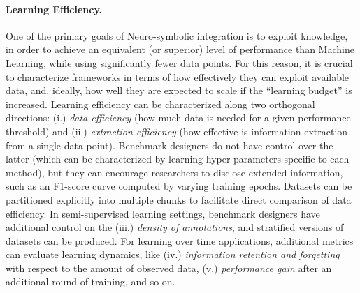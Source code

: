 \paragraph{Learning Efficiency.} One of the primary goals of Neuro-symbolic integration is to exploit knowledge, in order to achieve an equivalent (or superior) level of performance than Machine Learning, while using significantly fewer data points. For this reason, it is crucial to characterize frameworks in terms of how effectively they can exploit available data, and, ideally, how well they are expected to scale if the ``learning budget'' is increased. 
%
Learning efficiency can be characterized along two orthogonal directions: (i.) \textit{data efficiency} (how much data is needed for a given performance threshold) and (ii.) \textit{extraction efficiency} (how effective is information extraction from a single data point).
Benchmark designers do not have control over the latter (which can be characterized by learning hyper-parameters specific to each method), but they can encourage researchers to disclose extended information, such as an F1-score curve computed by varying training epochs.
Datasets can be partitioned explicitly into multiple chunks to facilitate direct comparison of data efficiency. %
%
In semi-supervised learning settings, benchmark designers have additional control on the (iii.) \textit{density of annotations}, and stratified versions of datasets can be produced.
For learning over time applications, additional metrics can evaluate learning dynamics, like (iv.) \textit{information retention and forgetting} with respect to the amount of observed data, (v.) \textit{performance gain} after an additional round of training, and so on.

